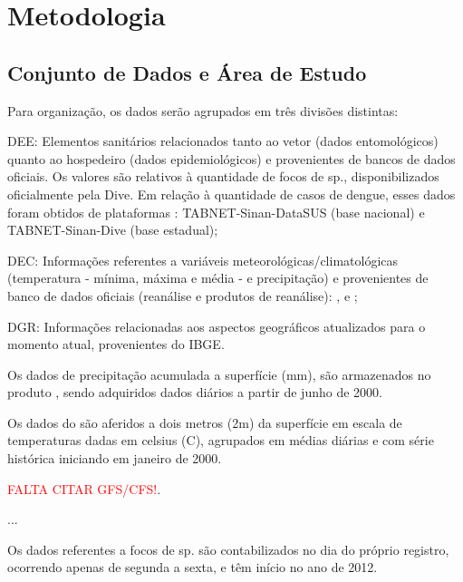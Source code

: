 \chapter{Metodologia}

\section{Conjunto de Dados e Área de Estudo}

Para organização, os dados serão agrupados em três divisões distintas: 

\begin{alineas}
    \item \acrfull{DEE}: Elementos sanitários relacionados tanto ao vetor (dados entomológicos) quanto ao hospedeiro (dados epidemiológicos) e provenientes de bancos de dados oficiais. Os valores são relativos à quantidade de focos de  sp., disponibilizados oficialmente pela \acrshort{Dive}. Em relação à quantidade de casos de dengue, esses dados foram obtidos de plataformas : TABNET-\acrshort{Sinan}-\acrshort{DataSUS} (base nacional) e TABNET-\acrshort{Sinan}-\acrshort{Dive} (base estadual); 
    
    \item \acrfull{DEC}: Informações referentes a variáveis meteorológicas/climatológicas (temperatura - mínima, máxima e média - e precipitação) e provenientes de banco de dados oficiais (reanálise e produtos de reanálise):  ,  e ;

    \item \acrfull{DGR}: Informações relacionadas aos aspectos geográficos atualizados para o momento atual, provenientes do \acrshort{IBGE}. 
\end{alineas}

\indent Os dados de precipitação acumulada a superfície (mm), são armazenados no produto ,  sendo adquiridos dados diários a partir de junho de 2000.

\indent Os dados do  são aferidos a dois metros (2m) da superfície em escala de temperaturas dadas em celsius (C), agrupados em médias diárias e com série histórica iniciando em janeiro de 2000.

\indent \textcolor{red}{FALTA CITAR GFS/CFS!}.

\indent ...

\indent Os dados referentes a focos de  sp. são contabilizados no dia do próprio registro, ocorrendo apenas de segunda a sexta, e têm início no ano de 2012.


